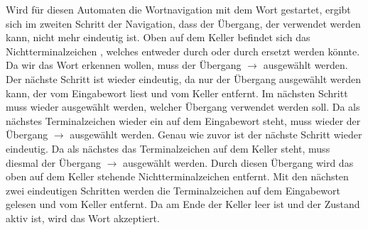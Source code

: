 Wird für diesen Automaten die Wortnavigation mit dem Wort  gestartet,
ergibt sich im zweiten Schritt der Navigation, dass der Übergang, der verwendet
werden kann, nicht mehr eindeutig ist. Oben auf dem Keller befindet sich das
Nichtterminalzeichen , welches entweder durch
\TerminalSymbol{$\epsilon$} oder durch
 ersetzt werden könnte. Da
wir das Wort  erkennen wollen, muss der Übergang 
$\to$  ausgewählt werden.
Der nächste Schritt ist wieder eindeutig, da nur der Übergang ausgewählt werden
kann, der  vom Eingabewort liest und  vom
Keller entfernt. Im nächsten Schritt muss wieder ausgewählt werden, welcher
Übergang verwendet werden soll. Da als nächstes Terminalzeichen wieder ein
 auf dem Eingabewort steht, muss wieder der Übergang 
$\to$  ausgewählt werden.
Genau wie zuvor ist der nächste Schritt wieder eindeutig. Da als nächstes das
Terminalzeichen  auf dem Keller steht, muss diesmal der
Übergang  $\to$ \TerminalSymbol{$\epsilon$} ausgewählt werden.
Durch diesen Übergang wird das oben auf dem Keller stehende
Nichtterminalzeichen  entfernt. Mit den nächsten zwei
eindeutigen Schritten werden die Terminalzeichen  auf dem
Eingabewort gelesen und vom Keller entfernt. Da am Ende der Keller leer ist und
der Zustand  aktiv ist, wird das Wort akzeptiert.